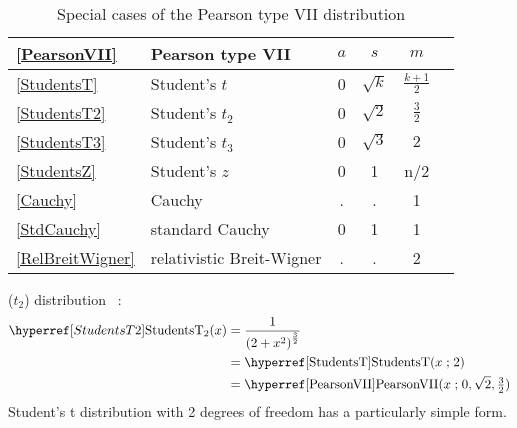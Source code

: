 \begin{table*}[tp]
\begin{center}
\caption[Pearson VII distribution -- Special cases]{Special cases of the Pearson type VII distribution}
~\\
{\renewcommand{\arraystretch}{1.25}
\begin{tabular}{llcccl}
\eqref{PearsonVII}&Pearson type VII & $a$ & $s$ & $m$  &  \\
 \hline
\eqref{StudentsT}& Student's $t$		& 0	& $\sqrt{k}$ & $\tfrac{k+1}{2}$  \\
\eqref{StudentsT2}& Student's $t_2$		& 0	& $\sqrt{2}$ & $\tfrac{3}{2}$  \\
\eqref{StudentsT3}& Student's $t_3$		& 0	& $\sqrt{3}$ & $2$  \\
\eqref{StudentsZ}& Student's $z$             	& 0 & 1&  n/2  \\
\eqref{Cauchy} &Cauchy 			& . & . & 1  \\
\eqref{StdCauchy} &standard Cauchy 			& 0 & 1 & 1  \\
\eqref{RelBreitWigner}& relativistic Breit-Wigner  & . & . & 2 \\
\end{tabular} }
\end{center}
\end{table*}




 ($t_2$) distribution~\cite{Jones2002} :
\begin{align}
\label{StudentsT2}
\StudentsTT(x) 
&= \frac{1}{\left( 2 + x^2 \right)^{\frac{3}{2} } } \checked
\\ \notag 
& = \opr{StudentsT}(x\given 2) \checked
\\ \notag
&= \opr{PearsonVII}(x\given 0,\sqrt{2},\tfrac{3}{2}) \checked
\end{align}
Student's t distribution with 2 degrees of freedom has a particularly simple form. 

